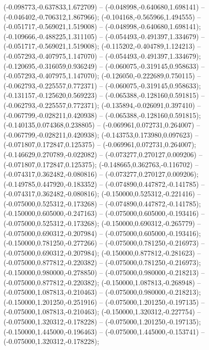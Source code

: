  (-0.098773,-0.637833,1.672709) -- (-0.048998,-0.640680,1.698141) -- (-0.046402,-0.706312,1.867966);
 (-0.104168,-0.565966,1.494555) -- (-0.051717,-0.569021,1.519008) -- (-0.048998,-0.640680,1.698141);
 (-0.109666,-0.488225,1.311105) -- (-0.054493,-0.491397,1.334679) -- (-0.051717,-0.569021,1.519008);
 (-0.115202,-0.404789,1.124213) -- (-0.057293,-0.407975,1.147070) -- (-0.054493,-0.491397,1.334679);
 (-0.120695,-0.316059,0.936249) -- (-0.060075,-0.319145,0.958633) -- (-0.057293,-0.407975,1.147070);
 (-0.126050,-0.222689,0.750115) -- (-0.062793,-0.225557,0.772371) -- (-0.060075,-0.319145,0.958633);
 (-0.131157,-0.125620,0.569223) -- (-0.065388,-0.128160,0.591815) -- (-0.062793,-0.225557,0.772371);
 (-0.135894,-0.026091,0.397410) -- (-0.067799,-0.028211,0.420938) -- (-0.065388,-0.128160,0.591815);
 (-0.140135,0.074368,0.238805) -- (-0.069961,0.072731,0.264007) -- (-0.067799,-0.028211,0.420938);
 (-0.143753,0.173980,0.097623) -- (-0.071807,0.172847,0.125375) -- (-0.069961,0.072731,0.264007);
 (-0.146629,0.270789,-0.022082) -- (-0.073277,0.270127,0.009206) -- (-0.071807,0.172847,0.125375);
 (-0.148665,0.362763,-0.116702) -- (-0.074317,0.362482,-0.080816) -- (-0.073277,0.270127,0.009206);
 (-0.149785,0.447920,-0.183352) -- (-0.074890,0.447872,-0.141785) -- (-0.074317,0.362482,-0.080816);
 (-0.150000,0.525312,-0.221416) -- (-0.075000,0.525312,-0.173268) -- (-0.074890,0.447872,-0.141785);
 (-0.150000,0.605000,-0.247163) -- (-0.075000,0.605000,-0.193416) -- (-0.075000,0.525312,-0.173268);
 (-0.150000,0.690312,-0.265779) -- (-0.075000,0.690312,-0.207984) -- (-0.075000,0.605000,-0.193416);
 (-0.150000,0.781250,-0.277266) -- (-0.075000,0.781250,-0.216973) -- (-0.075000,0.690312,-0.207984);
 (-0.150000,0.877812,-0.281623) -- (-0.075000,0.877812,-0.220382) -- (-0.075000,0.781250,-0.216973);
 (-0.150000,0.980000,-0.278850) -- (-0.075000,0.980000,-0.218213) -- (-0.075000,0.877812,-0.220382);
 (-0.150000,1.087813,-0.268948) -- (-0.075000,1.087813,-0.210463) -- (-0.075000,0.980000,-0.218213);
 (-0.150000,1.201250,-0.251916) -- (-0.075000,1.201250,-0.197135) -- (-0.075000,1.087813,-0.210463);
 (-0.150000,1.320312,-0.227754) -- (-0.075000,1.320312,-0.178228) -- (-0.075000,1.201250,-0.197135);
 (-0.150000,1.445000,-0.196463) -- (-0.075000,1.445000,-0.153741) -- (-0.075000,1.320312,-0.178228);
